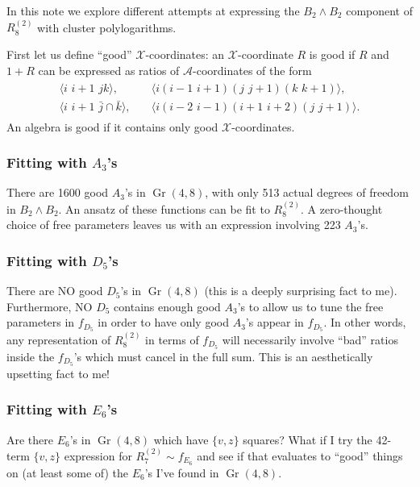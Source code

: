 \documentclass[12pt]{article}
\DeclareMathOperator{\Gr}{Gr}
\def\ket#1{\langle #1 \rangle}
\begin{document}
\thispagestyle{fancyplain}
 
\fancyhf{}
 
\cfoot{\fancyplain{}{\thepage}}


In this note we explore different attempts at expressing the $B_2\wedge B_2$ component of $R^{(2)}_8$ with cluster polylogarithms.

First let us define ``good'' $\mathcal{X}$-coordinates: an $\mathcal{X}$-coordinate $R$ is good if $R$ and $1+R$ can be expressed as ratios of $\mathcal{A}$-coordinates of the form
\begin{align}\label{def:letters}
\begin{split}
\ket{i\,\,i{+}1\,\,jk},& \quad 
\ket{i(i{-}1\,\,i{+}1)(j\,\,j{+}1)(k\,\,k{+}1)}, \\ 
\ket{i\,\,i{+}1\,\,\bar{j}\cap\bar{k}},& \quad
\ket{i(i{-}2\,\,i{-}1)(i{+}1\,\,i{+}2)(j\,\,j{+}1)}.
\end{split}
\end{align}
An algebra is good if it contains only good $\mathcal{X}$-coordinates. 

\subsubsection*{Fitting with $A_3$'s}

There are 1600 good $A_3$'s in $\Gr(4,8)$, with only 513 actual degrees of freedom in $B_2\wedge B_2$. An ansatz of these functions can be fit to $R^{(2)}_8$. A zero-thought choice of free parameters leaves us with an expression involving 223 $A_3$'s.

\subsubsection*{Fitting with $D_5$'s}

There are NO good $D_5$'s in $\Gr(4,8)$ (this is a deeply surprising fact to me). Furthermore, NO $D_5$ contains enough good $A_3$'s to allow us to tune the free parameters in $f_{D_5}$ in order to have only good $A_3$'s appear in $f_{D_5}$. In other words, any representation of $R^{(2)}_8$ in terms of $f_{D_5}$ will necessarily involve ``bad'' ratios inside the $f_{D_5}$'s which must cancel in the full sum. This is an aesthetically upsetting fact to me!

\subsubsection*{Fitting with $E_6$'s}

Are there $E_6$'s in $\Gr(4,8)$ which have $\{v,z\}$ squares? What if I try the 42-term $\{v,z\}$ expression for $R^{(2)}_7 \sim f_{E_6}$ and see if that evaluates to ``good'' things on (at least some of) the $E_6$'s I've found in $\Gr(4,8)$.
\end{document}
